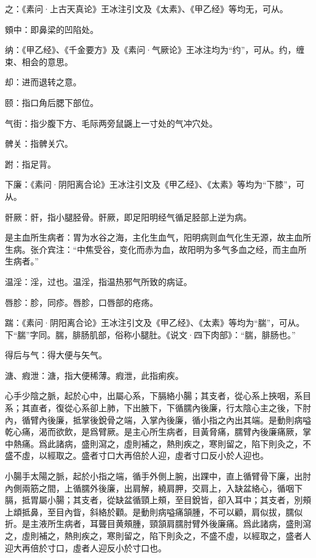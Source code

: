 \documentclass[12pt]{ctexbook}%
\begin{document}
\begin{jiaozhu}
	\item 之：《素问·上古天真论》王冰注引文及《太素》、《甲乙经》等均无，可从。
	\item 頞中：即鼻梁的凹陷处。
	\item 纳：《甲乙经》、《千金要方》及《素问·气厥论》王冰注均为“约”，可从。约，缠束、相会的意思。
	\item 却：进而退转之意。
	\item 颐：指口角后腮下部位。
	\item 气街：指少腹下方、毛际两旁鼠鼷上一寸处的气冲穴处。
	\item 髀关：指髀关穴。
	\item 跗：指足背。
	\item 下廉：《素问·阴阳离合论》王冰注引文及《甲乙经》、《太素》等均为“下膝”，可从。
	\item 骭厥：骭，指小腿胫骨。骭厥，即足阳明经气循足胫部上逆为病。
	\item 是主血所生病者：胃为水谷之海，主化生血气，阳明病则血气化生无源，故主血所生病。张介宾注：“中焦受谷，变化而赤为血，故阳明为多气多血之经，而主血所生病者。”
	\item 温淫：淫，过也。温淫，指温热邪气所致的病证。
	\item 唇胗：胗，同疹。唇胗，口唇部的疮疡。
	\item 踹：《素问·阴阳离合论》王冰注引文及《甲乙经》、《太素》等均为“腨”，可从。下“腨”字同。腨，腓肠肌部，俗称小腿肚。《说文·四下肉部》：“腨，腓肠也。”
	\item 得后与气：得大便与矢气。
	\item 溏、瘕泄：溏，指大便稀薄。瘕泄，此指痢疾。
\end{jiaozhu}


\begin{yuanwen}
心手少陰之脈，起於心中，出屬心系，下膈絡小腸；其支者，從心系上挾咽，系目系；其直者，復從心系卻上肺，下出腋下，下循臑內後廉，行太陰心主之後，下肘內，循臂內後廉，抵掌後銳骨之端，入掌內後廉，循小指之內出其端。是動則病嗌乾心痛，渴而欲飲，是爲臂厥。是主心所生病者，目黃脅痛，臑臂內後廉痛厥，掌中熱痛。爲此諸病，盛則瀉之，虛則補之，熱則疾之，寒則留之，陷下則灸之，不盛不虛，以經取之。盛者寸口大再倍於人迎，虛者寸口反小於人迎也。

小腸手太陽之脈，起於小指之端，循手外側上腕，出踝中，直上循臂骨下廉，出肘內側兩筋之間，上循臑外後廉，出肩解，繞肩胛，交肩上，入缺盆絡心，循咽下膈，抵胃屬小腸；其支者，從缺盆循頸上頰，至目銳皆，卻入耳中；其支者，別頰上䪼抵鼻，至目內眥，斜絡於顴。是動則病嗌痛頷腫，不可以顧，肩似拔，臑似折。是主液所生病者，耳聾目黄頰腫，頸頷肩臑肘臂外後廉痛。爲此諸病，盛則瀉之，虛則補之，熱則疾之，寒則留之，陷下則灸之，不盛不虛，以經取之，盛者人迎大再倍於寸口，虛者人迎反小於寸口也。
\end{yuanwen}
\end{document}
